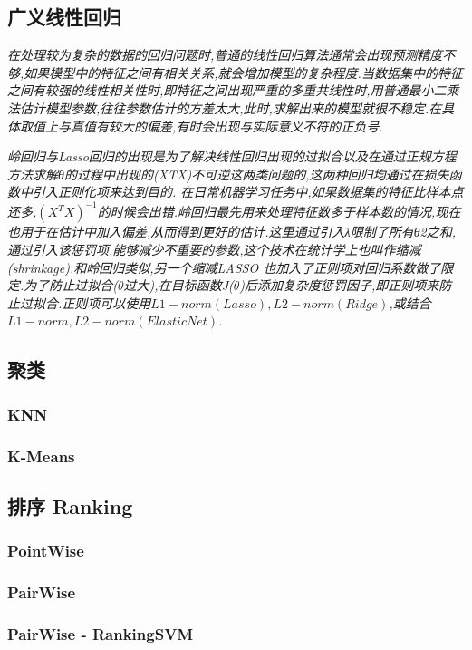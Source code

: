 \documentclass{scrartcl}
\numberwithin{equation}{section}   %
\begin{document}
\subsection{广义线性回归}

\textsl{在处理较为复杂的数据的回归问题时,普通的线性回归算法通常会出现预测精度不够,如果模型中的特征之间有相关关系,就会增加模型的复杂程度.当数据集中的特征之间有较强的线性相关性时,即特征之间出现严重的多重共线性时,用普通最小二乘法估计模型参数,往往参数估计的方差太大,此时,求解出来的模型就很不稳定.在具体取值上与真值有较大的偏差,有时会出现与实际意义不符的正负号.}


\textsl{岭回归与Lasso回归的出现是为了解决线性回归出现的过拟合以及在通过正规方程方法求解θ的过程中出现的(XTX)不可逆这两类问题的,这两种回归均通过在损失函数中引入正则化项来达到目的.
在日常机器学习任务中,如果数据集的特征比样本点还多,$(X^TX)^{-1}$的时候会出错.岭回归最先用来处理特征数多于样本数的情况,现在也用于在估计中加入偏差,从而得到更好的估计.这里通过引入λ限制了所有θ2之和,通过引入该惩罚项,能够减少不重要的参数,这个技术在统计学上也叫作缩减(shrinkage).和岭回归类似,另一个缩减LASSO 也加入了正则项对回归系数做了限定.为了防止过拟合($\theta$过大),在目标函数J($\theta$)后添加复杂度惩罚因子,即正则项来防止过拟合.正则项可以使用$L1-norm(Lasso),L2-norm(Ridge)$,或结合$L1-norm,L2-norm(Elastic Net)$.}
\subsection{聚类}
\subsubsection{KNN}
\subsubsection{K-Means}
\subsection{排序 Ranking}
\subsubsection{PointWise}
\subsubsection{PairWise}
\subsubsection{PairWise - RankingSVM}
\end{document}
